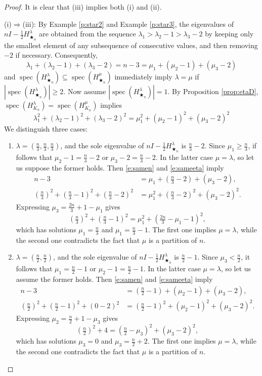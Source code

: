 \documentclass[12pt,dvipsnames,accepted=2016-08-18,a4paper,onecolumn]{quantumarticle}
\def\starn{{\bigstar_{n}}}
\DeclareMathOperator{\spec}{spec}
\numberwithin{equation}{section}
\theoremstyle{definition}
\begin{document}
\begin{proof}
It is clear that (iii) implies both (i) and (ii).

(i)$\Rightarrow$(iii): By Example \ref{p:star2} and Example \ref{p:star3}, 
the eigenvalues of $nI-\frac12 H_{\starn}^{\lambda}$ are obtained from the sequence
${\lambda}_1>{\lambda}_2-1>{\lambda}_3-2$ by keeping only the smallest element of any subsequence of consecutive values, and then removing $-2$ if necessary.
Consequently,
\begin{equation}\label{e:samen}
{\lambda}_1+({\lambda}_2-1)+({\lambda}_3-2)
=n-3=
{\mu}_1+({\mu}_2-1)+({\mu}_3-2)
\end{equation}
and
$\spec(H_{\starn}^{\lambda})\subseteq\spec(H_{\starn}^{\mu})$ 
immediately imply $\lambda=\mu$ if $|\spec(H_{\starn}^{\lambda})|\ge 2$. 
Now assume $|\spec(H_{\starn}^{\lambda})|=1$. By Proposition \ref{prop:etaD}, $\spec(H_{K_n}^{\lambda})=\spec(H_{K_n}^{\mu})$ implies
\begin{equation}\label{e:sameeta}
{\lambda}_1^2+({\lambda}_2-1)^2+({\lambda}_3-2)^2
={\mu}_1^2+({\mu}_2-1)^2+({\mu}_3-2)^2
\end{equation}
We distinguish three cases:
\begin{enumerate}[\rm(1)]
\item ${\lambda}=(\frac{n}{3},\frac{n}{3},\frac{n}{3})$, and the sole eigenvalue of $nI-\frac12 H_{\starn}^{\lambda}$ is $\frac{n}{3}-2$. Since ${\mu}_1\ge\frac{n}{3}$, if follows that ${\mu}_2-1=\frac{n}{3}-2$ or ${\mu}_3-2=\frac{n}{3}-2$.
In the latter case $\mu=\lambda$, so let us suppose the former holds. Then \eqref{e:samen} and \eqref{e:sameeta} imply
\begin{align*}
n-3&={\mu}_1+(\tfrac{n}{3}-2)+({\mu}_3-2),\\
(\tfrac{n}{3})^2+(\tfrac{n}{3}-1)^2+(\tfrac{n}{3}-2)^2
&={\mu}_1^2+(\tfrac{n}{3}-2)^2+({\mu}_3-2)^2.
\end{align*}
Expressing ${\mu}_3=\frac{2n}{3}+1-{\mu}_1$ gives
$$(\tfrac{n}{3})^2+(\tfrac{n}{3}-1)^2
={\mu}_1^2+(\tfrac{2n}{3}-{\mu}_1-1)^2,$$
which has solutions ${\mu}_1=\frac{n}{3}$ and ${\mu}_1=\frac{n}{3}-1$. The first one implies ${\mu}={\lambda}$, while the second one contradicts the fact that ${\mu}$ is a partition of $n$.

\item ${\lambda}=(\frac{n}{2},\frac{n}{2})$, and the sole eigenvalue of $nI-\frac12 H_{\starn}^{\lambda}$ is $\frac{n}{2}-1$. Since ${\mu}_3<\frac{n}{2}$, it follows that ${\mu}_1=\frac{n}{2}-1$ or ${\mu}_2-1=\frac{n}{2}-1$.
In the latter case ${\mu}={\lambda}$, so let us assume the former holds.
Then \eqref{e:samen} and \eqref{e:sameeta} imply
\begin{align*}
n-3&=(\tfrac{n}{2}-1)+({\mu}_2-1)+({\mu}_3-2),\\
(\tfrac{n}{2})^2+(\tfrac{n}{2}-1)^2+(0-2)^2
&=(\tfrac{n}{2}-1)^2+({\mu}_2-1)^2+({\mu}_3-2)^2.
\end{align*}
Expressing ${\mu}_2=\tfrac{n}{2}+1-{\mu}_3$ gives
$$(\tfrac{n}{2})^2+4
=(\tfrac{n}{2}-{\mu}_3)^2+({\mu}_3-2)^2,$$
which has solutions ${\mu}_3=0$ and ${\mu}_3=\frac{n}{2}+2$. The first one implies ${\mu}={\lambda}$, while the second one contradicts the fact that ${\mu}$ is a partition of $n$.


\end{enumerate}
\end{proof}
\end{document}
